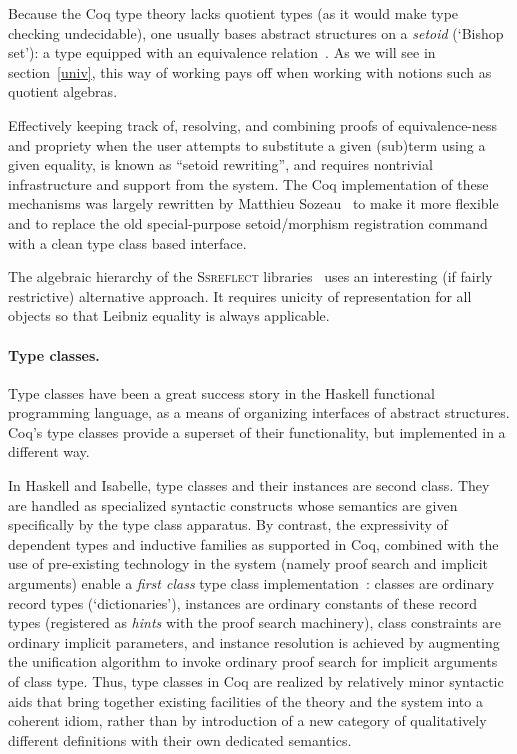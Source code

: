 \documentclass[a4paper,10pt,runningheads]{llncs}
\begin{document}
Because the Coq type theory lacks quotient types (as it would make type checking undecidable), one usually bases abstract structures on a \emph{setoid} (`Bishop set'): a type equipped with an equivalence relation~\cite{Bishop67,Hofmann,Capretta}. As we will see in section~\ref{univ}, this way of working pays off when working with notions such as quotient algebras.

Effectively keeping track of, resolving, and combining proofs of equivalence-ness and propriety when the user attempts to substitute a given (sub)term using a given equality, is known as ``setoid rewriting'', and requires nontrivial infrastructure and support from the system. The Coq implementation of these mechanisms was largely rewritten by Matthieu Sozeau~\cite{Setoid-rewrite} to make it more flexible and to replace the old special-purpose setoid/morphism registration command with a clean type class based interface.

The algebraic hierarchy of the \textsc{Ssreflect} libraries~\cite{Packed} uses an interesting (if fairly restrictive) alternative approach. It requires unicity of representation for all objects so that Leibniz equality is always applicable.

\paragraph{Type classes.}

Type classes have been a great success story in the Haskell functional programming language, as a means of organizing interfaces of abstract structures. Coq's type classes provide a superset of their functionality, but implemented in a different way.

In Haskell and Isabelle, type classes and their instances are second class. They are handled as specialized syntactic constructs whose semantics are given specifically by the type class apparatus. By contrast, the expressivity of dependent types and inductive families as supported in Coq, combined with the use of pre-existing technology in the system (namely proof search and implicit arguments) enable a \emph{first class} type class implementation~\cite{DBLP:conf/tphol/SozeauO08}: classes are ordinary record types (`dictionaries'), instances are ordinary constants of these record types (registered as \emph{hints} with the proof search machinery), class constraints are ordinary implicit parameters, and instance resolution is achieved by augmenting the unification algorithm to invoke ordinary proof search for implicit arguments of class type.
Thus, type classes in Coq are realized by relatively minor syntactic aids that bring together existing facilities of the theory and the system into a coherent idiom, rather than by introduction of a new category of qualitatively different definitions with their own dedicated semantics.
\end{document}
